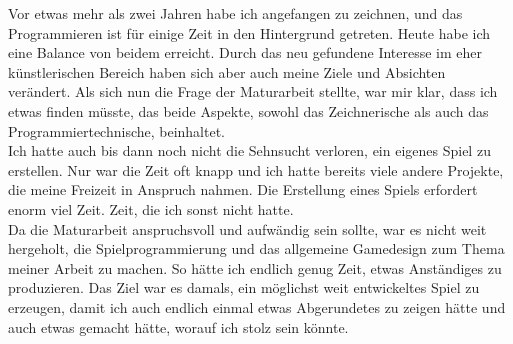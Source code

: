 \documentclass[12pt,a4paper,titlepage]{article}
\begin{document}
		Vor etwas mehr als zwei Jahren habe ich angefangen zu zeichnen, und das Programmieren ist für einige Zeit in den Hintergrund getreten.
		Heute habe ich eine Balance von beidem erreicht. Durch das neu gefundene Interesse im eher künstlerischen Bereich haben sich aber auch meine Ziele und Absichten verändert.
		Als sich nun die Frage der Maturarbeit stellte, war mir klar, dass ich etwas finden müsste, das beide Aspekte, sowohl das Zeichnerische als auch das Programmiertechnische, beinhaltet.\\
		Ich hatte auch bis dann noch nicht die Sehnsucht verloren, ein eigenes Spiel zu erstellen. Nur war die Zeit oft knapp und ich hatte bereits viele andere Projekte, die meine Freizeit in Anspruch nahmen. Die Erstellung eines Spiels erfordert enorm viel Zeit. Zeit, die ich sonst nicht hatte.\\
		
		Da die Maturarbeit anspruchsvoll und aufwändig sein sollte, war es nicht weit hergeholt, die Spielprogrammierung und das allgemeine Gamedesign zum Thema meiner Arbeit zu machen. So hätte ich endlich genug Zeit, etwas Anständiges zu produzieren.
		Das Ziel war es damals, ein möglichst weit entwickeltes Spiel zu erzeugen, damit ich auch endlich einmal etwas Abgerundetes zu zeigen hätte und auch etwas gemacht hätte, worauf ich stolz sein könnte.\\
		
		
\end{document}
